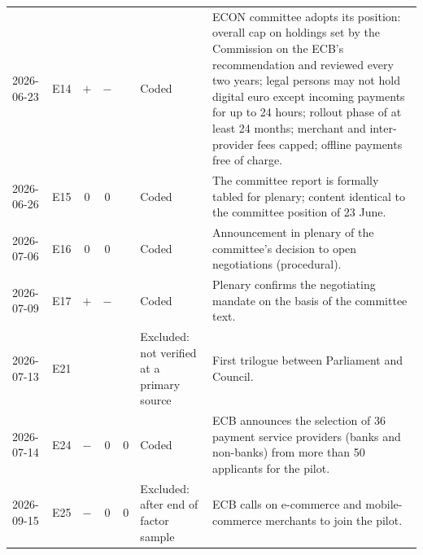 \begin{longtable}{P{1.55cm}P{0.5cm}ccc P{2.6cm} P{6.0cm}}
2026-06-23 & E14 & $+$ & $-$ &  & Coded & ECON committee adopts its position: overall cap on holdings set by the Commission on the ECB's recommendation and reviewed every two years; legal persons may not hold digital euro except incoming payments for up to 24 hours; rollout phase of at least 24 months; merchant and inter-provider fees capped; offline payments free of charge. \\
2026-06-26 & E15 & $0$ & $0$ &  & Coded & The committee report is formally tabled for plenary; content identical to the committee position of 23 June. \\
2026-07-06 & E16 & $0$ & $0$ &  & Coded & Announcement in plenary of the committee's decision to open negotiations (procedural). \\
2026-07-09 & E17 & $+$ & $-$ &  & Coded & Plenary confirms the negotiating mandate on the basis of the committee text. \\
2026-07-13 & E21 &  &  &  & Excluded: not verified at a primary source & First trilogue between Parliament and Council. \\
2026-07-14 & E24 & $-$ & $0$ & $0$ & Coded & ECB announces the selection of 36 payment service providers (banks and non-banks) from more than 50 applicants for the pilot. \\
2026-09-15 & E25 & $-$ & $0$ & $0$ & Excluded: after end of factor sample & ECB calls on e-commerce and mobile-commerce merchants to join the pilot. \\
\end{longtable}
